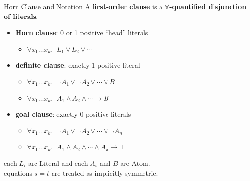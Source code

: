 \documentclass[aspectratio=43]{beamer}
\begin{document}
\begin{frame}{Horn Clause and Notation}
    A \textbf{first-order clause} is a \textbf{$\forall$-quantified disjunction of literals}.
    \begin{itemize}
      \item \textbf{Horn clause}: 0 or 1 positive ``head'' literals
      \begin{itemize}
          \item $\forall x_1 \dots x_k.\;$ $L_1 \lor L_2 \lor \cdots$ 
      \end{itemize}
      \item \textbf{definite clause}: exactly 1 positive literal
      \begin{itemize}
          \item $\forall x_1 \dots x_k.\;$ $\neg A_1 \lor \neg A_2 \lor \cdots \lor B$ 
          \item $\forall x_1 \dots x_k.\;$ $A_1 \land A_2 \land \cdots \rightarrow B$
      \end{itemize}
      \item \textbf{goal clause}: exactly 0 positive literals
      \begin{itemize}
          \item $\forall x_1 \dots x_k.\;$ $\neg A_1 \lor \neg A_2 \lor \cdots \lor \neg A_n$ 
          \item $\forall x_1 \dots x_k.\;$ $A_1 \land A_2 \land \cdots \land A_n \rightarrow \bot$
      \end{itemize}
    \end{itemize}
    \vfill
    {\footnotesize each $L_i$ are Literal and each $A_i$ and $B$ are Atom. \\}
    {\footnotesize equations $s = t$ are treated as implicitly symmetric. \\}
\end{frame}
\end{document}
